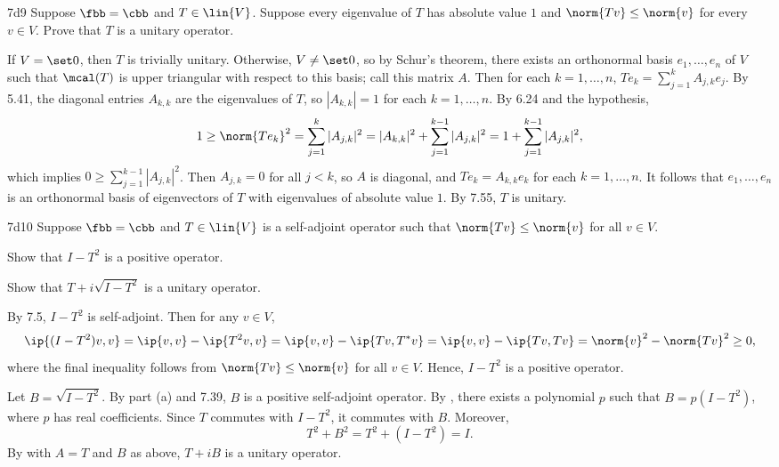 \begin{exercise}{7d9}
    Suppose $\fbb = \cbb$ and $T \in \lin{V}$.
    Suppose every eigenvalue of $T$ has absolute value $1$ and $\norm{Tv} \leq \norm{v}$ for every $v \in V$.
    Prove that $T$ is a unitary operator.
\end{exercise}

\begin{sol}
    If $V = \set 0$, then $T$ is trivially unitary.
    Otherwise, $V \neq \set 0$, so by Schur's theorem, there exists an orthonormal basis $e_1, \ldots, e_n$ of $V$ such that $\mcal(T)$ is upper triangular with respect to this basis; call this matrix $A$.
    Then for each $k = 1, \ldots, n$, $T e_k = \sum_{j=1}^k A_{j, k} e_j$.
    By 5.41, the diagonal entries $A_{k, k}$ are the eigenvalues of $T$, so $|A_{k, k}| = 1$ for each $k = 1, \ldots, n$.
    By 6.24 and the hypothesis,
    \[
        1 \geq \norm{T e_k}^2 = \sum_{j=1}^k |A_{j, k}|^2 = |A_{k, k}|^2 + \sum_{j=1}^{k-1} |A_{j, k}|^2 = 1 + \sum_{j=1}^{k-1} |A_{j, k}|^2,
    \]
    which implies $0 \geq \sum_{j=1}^{k-1} |A_{j, k}|^2$.
    Then $A_{j, k} = 0$ for all $j < k$, so $A$ is diagonal, and $T e_k = A_{k, k} e_k$ for each $k = 1, \ldots, n$.
    It follows that $e_1, \ldots, e_n$ is an orthonormal basis of eigenvectors of $T$ with eigenvalues of absolute value $1$.
    By 7.55, $T$ is unitary.
\end{sol}

\begin{exercise}{7d10}
    Suppose $\fbb = \cbb$ and $T \in \lin{V}$ is a self-adjoint operator such that $\norm{Tv} \leq \norm{v}$ for all $v \in V$.
    \begin{subexercises}
        \item Show that $I - T^2$ is a positive operator.
        \item Show that $T + i\sqrt{I - T^2}$ is a unitary operator.
    \end{subexercises}
\end{exercise}

\begin{solenum}
    \item By 7.5, $I - T^2$ is self-adjoint.
    Then for any $v \in V$,
    \[
        \ip{(I - T^2)v, v} = \ip{v, v} - \ip{T^2 v, v} = \ip{v, v} - \ip{T v, T^\ast v} = \ip{v, v} - \ip{T v, T v} = \norm{v}^2 - \norm{Tv}^2 \geq 0,
    \]
    where the final inequality follows from $\norm{Tv} \leq \norm{v}$ for all $v \in V$.
    Hence, $I - T^2$ is a positive operator.
    \item Let $B = \sqrt{I - T^2}$.
    By part (a) and 7.39, $B$ is a positive self-adjoint operator.
    By , there exists a polynomial $p$ such that $B = p(I - T^2)$, where $p$ has real coefficients.
    Since $T$ commutes with $I - T^2$, it commutes with $B$.
    Moreover,
    \[
        T^2 + B^2 = T^2 + (I - T^2) = I.
    \]
    By  \leftimp with $A = T$ and $B$ as above, $T + iB$ is a unitary operator.
\end{solenum}

